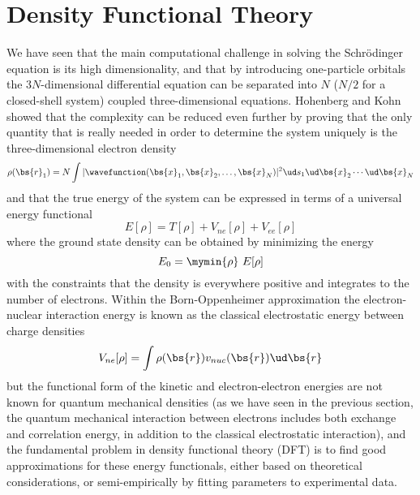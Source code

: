 \section{Density Functional Theory} \label{sec:DFT}
We have seen that the main computational challenge in solving the Schr\"{o}dinger equation is its high
dimensionality, and that by introducing one-particle orbitals the $3N$-dimensional differential equation
can be separated into $N$ ($N/2$ for a closed-shell system) coupled three-dimensional equations. Hohenberg 
and Kohn\cite{Hohenberg-Kohn:1964} 
showed that the complexity can be reduced even further by proving that the only quantity that is really
needed in order to determine the system uniquely is the three-dimensional electron density
\begin{equation}
    \rho(\bs{r}_1) = N \int |\wavefunction(\bs{x}_1,\bs{x}_2,\dots,\bs{x}_N)|^2 
	\ud s_1 \ud \bs{x}_2 \cdots \ud \bs{x}_N
\end{equation}
and that the true energy of the system can be expressed in terms of a universal energy functional
\begin{equation}
    E[\rho] = T[\rho] + V_{ne}[\rho] + V_{ee}[\rho]
\end{equation}
where the ground state density can be obtained by minimizing the energy
\begin{equation}
    E_0 = \mymin{\rho}\ E[\rho]
\end{equation}
with the constraints that the density is everywhere positive and integrates to the number
of electrons. Within the Born-Oppenheimer approximation the electron-nuclear interaction
energy is known as the classical electrostatic energy between charge densities
\begin{equation}
    V_{ne}[\rho] = \int \rho(\bs{r})v_{nuc}(\bs{r}) \ud \bs{r}
\end{equation}
but the functional form of the kinetic and electron-electron energies are not known for quantum
mechanical densities (as we have seen in the previous section, the quantum mechanical interaction 
between electrons includes both exchange and correlation energy, in addition to the classical
electrostatic interaction), and the fundamental problem in density functional theory 
(DFT) is to find good approximations for these energy functionals, either based on theoretical 
considerations, or semi-empirically by fitting parameters to experimental data.

